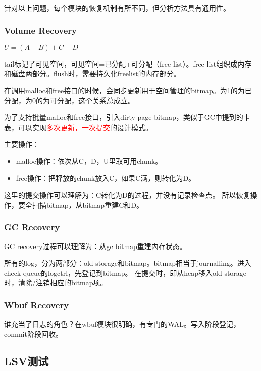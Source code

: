 \documentclass[UTF8]{ctexart}
\begin{document}
针对以上问题，每个模块的恢复机制有所不同，但分析方法具有通用性。

\subsubsection{Volume Recovery}

 $U = (A - B) + C + D$

tail标记了可见空间，可见空间=已分配+可分配（free list）。free list组织成内存和磁盘两部分。flush时，需要持久化freelist的内存部分。

在调用malloc和free接口的时候，会同步更新用于空间管理的bitmap。为1的为已分配，为0的为可分配，这个关系总成立。

为了支持批量malloc和free接口，引入dirty page bitmap，类似于GC中提到的卡表，可以实现\textcolor{red}{多次更新，一次提交}的设计模式。

主要操作：
\begin{tcolorbox}
\begin{itemize}
    \item malloc操作：依次从C，D，U里取可用chunk。
    \item free操作：把释放的chunk放入C，如果C满，则转化为D。
\end{itemize}
\end{tcolorbox}

这里的提交操作可以理解为：C转化为D的过程，并没有记录检查点。
所以恢复操作，要全扫描bitmap，从bitmap重建C和D。

\subsubsection{GC Recovery}

GC recovery过程可以理解为：从gc bitmap重建内存状态。

所有的log，分为两部分：old storage和bitmap。bitmap相当于journalling。进入check queue的logctrl，先登记到bitmap。
在提交时，即从heap移入old storage时，清除/注销相应的bitmap项。

\subsubsection{Wbuf Recovery}

谁充当了日志的角色？在wbuf模块很明确，有专门的WAL。写入阶段登记，commit阶段回收。

\subsection{LSV测试}
\end{document}
